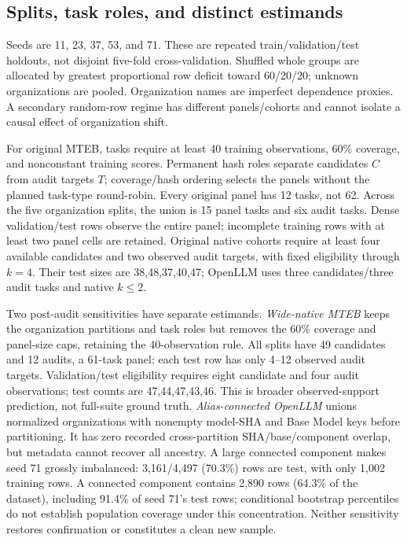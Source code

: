 \documentclass{article}
\begin{document}
\subsection{Splits, task roles, and distinct estimands}\label{sec:support}
Seeds are 11, 23, 37, 53, and 71. These are repeated train/validation/test holdouts, not disjoint five-fold cross-validation. Shuffled whole groups are allocated by greatest proportional row deficit toward 60/20/20; unknown organizations are pooled. Organization names are imperfect dependence proxies. A secondary random-row regime has different panels/cohorts and cannot isolate a causal effect of organization shift.

For original MTEB, tasks require at least 40 training observations, 60\% coverage, and nonconstant training scores. Permanent hash roles separate candidates $C$ from audit targets $T$; coverage/hash ordering selects the panels without the planned task-type round-robin. Every original panel has 12 tasks, not 62. Across the five organization splits, the union is 15 panel tasks and six audit tasks. Dense validation/test rows observe the entire panel; incomplete training rows with at least two panel cells are retained. Original native cohorts require at least four available candidates and two observed audit targets, with fixed eligibility through $k=4$. Their test sizes are 38,48,37,40,47; OpenLLM uses three candidates/three audit tasks and native $k\leq2$.

Two post-audit sensitivities have separate estimands. \emph{Wide-native MTEB} keeps the organization partitions and task roles but removes the 60\% coverage and panel-size caps, retaining the 40-observation rule. All splits have 49 candidates and 12 audits, a 61-task panel; each test row has only 4--12 observed audit targets. Validation/test eligibility requires eight candidate and four audit observations; test counts are 47,44,47,43,46. This is broader observed-support prediction, not full-suite ground truth. \emph{Alias-connected OpenLLM} unions normalized organizations with nonempty model-SHA and Base Model keys before partitioning. It has zero recorded cross-partition SHA/base/component overlap, but metadata cannot recover all ancestry. A large connected component makes seed 71 grossly imbalanced: 3,161/4,497 (70.3\%) rows are test, with only 1,002 training rows. A connected component contains 2,890 rows (64.3\% of the dataset), including 91.4\% of seed 71's test rows; conditional bootstrap percentiles do not establish population coverage under this concentration. Neither sensitivity restores confirmation or constitutes a clean new sample.
\end{document}
